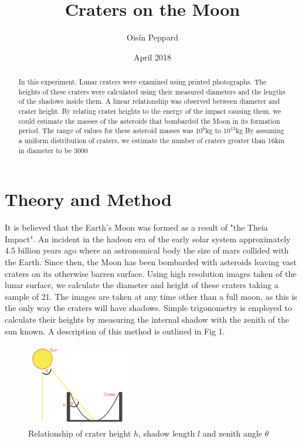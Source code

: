 \documentclass{article}
\title{Craters on the Moon}
\author{Oisín Peppard}
\date{April 2018}
\begin{document}
\maketitle

\begin{abstract}
In this experiment, Lunar craters were examined using printed photographs. The heights of these craters were calculated using their measured diameters and the lengths of the shadows inside them. A linear relationship was observed between diameter and crater height. By relating crater heights to the energy of the impact causing them, we could estimate the masses of the asteroids that bombarded the Moon in its formation period. The range of values for these asteroid masses was $10^6$kg to $10^{13}$kg
By assuming a uniform distribution of craters, we estimate the number of craters greater than $16$km in diameter to be 3000
\end{abstract}


\section*{Theory and Method}
It is believed that the Earth's Moon was formed as a result of "the Theia Impact". An incident in the hadeon era of the early solar system approximately 4.5 billion years ago where an astronomical body the size of mars collided with the Earth. Since then, the Moon has been bombarded with asteroids leaving vast craters on its otherwise barren surface. Using high resolution images taken of the lunar surface, we calculate the diameter and height of these craters taking a sample of 21. The images are taken at any time other than a full moon, as this is the only way the craters will have shadows. Simple trigonometry is employed to calculate their heights by measuring the internal shadow with the zenith of the sun known. A description of this method is outlined in Fig 1.

\begin{figure}[h]
    \centering
    \includegraphics[width = 0.4\textwidth]{Diagram.png}
    \caption{Relationship of crater height $h$, shadow length $l$ and zenith angle $\theta$}
    \label{fig:Diagram}
\end{figure}
\end{document}
